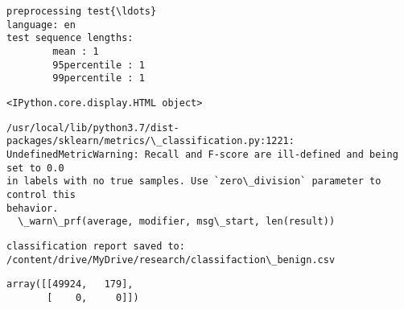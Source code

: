 \documentclass[11pt]{article}
\makeatletter
\newcommand{\boxspacing}{\kern\kvtcb@left@rule\kern\kvtcb@boxsep}
\newcommand{\prompt}[4]{
        {\ttfamily\llap{{\color{#2}[#3]:\hspace{3pt}#4}}\vspace{-\baselineskip}}
    }
\makeatother
\begin{document}
    \begin{Verbatim}[commandchars=\\\{\}]
preprocessing test{\ldots}
language: en
test sequence lengths:
        mean : 1
        95percentile : 1
        99percentile : 1
    \end{Verbatim}

    
    \begin{Verbatim}[commandchars=\\\{\}]
<IPython.core.display.HTML object>
    \end{Verbatim}

    
    \begin{Verbatim}[commandchars=\\\{\}]
/usr/local/lib/python3.7/dist-packages/sklearn/metrics/\_classification.py:1221:
UndefinedMetricWarning: Recall and F-score are ill-defined and being set to 0.0
in labels with no true samples. Use `zero\_division` parameter to control this
behavior.
  \_warn\_prf(average, modifier, msg\_start, len(result))
    \end{Verbatim}

    \begin{Verbatim}[commandchars=\\\{\}]
classification report saved to:
/content/drive/MyDrive/research/classifaction\_benign.csv
    \end{Verbatim}

            \begin{tcolorbox}[breakable, size=fbox, boxrule=.5pt, pad at break*=1mm, opacityfill=0]
\prompt{Out}{outcolor}{19}{\boxspacing}
\begin{Verbatim}[commandchars=\\\{\}]
array([[49924,   179],
       [    0,     0]])
\end{Verbatim}
\end{tcolorbox}
        

    
    
    
\end{document}
